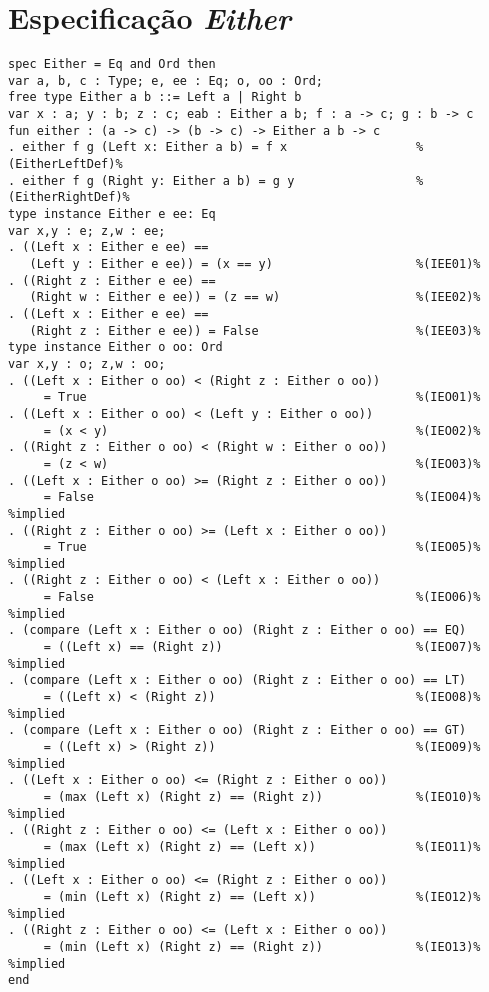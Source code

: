 \section{Especificação \textit{Either}}
\label{appendix:strictSpec:either}
\begin{Verbatim}
spec Either = Eq and Ord then
var a, b, c : Type; e, ee : Eq; o, oo : Ord;
free type Either a b ::= Left a | Right b     
var x : a; y : b; z : c; eab : Either a b; f : a -> c; g : b -> c
fun either : (a -> c) -> (b -> c) -> Either a b -> c
. either f g (Left x: Either a b) = f x                  %(EitherLeftDef)%
. either f g (Right y: Either a b) = g y                 %(EitherRightDef)%
type instance Either e ee: Eq
var x,y : e; z,w : ee;
. ((Left x : Either e ee) == 
   (Left y : Either e ee)) = (x == y)                    %(IEE01)%
. ((Right z : Either e ee) ==
   (Right w : Either e ee)) = (z == w)                   %(IEE02)%
. ((Left x : Either e ee) ==
   (Right z : Either e ee)) = False                      %(IEE03)%
type instance Either o oo: Ord
var x,y : o; z,w : oo;
. ((Left x : Either o oo) < (Right z : Either o oo))
     = True                                              %(IEO01)%
. ((Left x : Either o oo) < (Left y : Either o oo))
     = (x < y)                                           %(IEO02)%
. ((Right z : Either o oo) < (Right w : Either o oo))
     = (z < w)                                           %(IEO03)%
. ((Left x : Either o oo) >= (Right z : Either o oo))
     = False                                             %(IEO04)% %implied
. ((Right z : Either o oo) >= (Left x : Either o oo))
     = True                                              %(IEO05)% %implied
. ((Right z : Either o oo) < (Left x : Either o oo))
     = False                                             %(IEO06)% %implied
. (compare (Left x : Either o oo) (Right z : Either o oo) == EQ)
     = ((Left x) == (Right z))                           %(IEO07)% %implied
. (compare (Left x : Either o oo) (Right z : Either o oo) == LT)
     = ((Left x) < (Right z))                            %(IEO08)% %implied
. (compare (Left x : Either o oo) (Right z : Either o oo) == GT)
     = ((Left x) > (Right z))                            %(IEO09)% %implied
. ((Left x : Either o oo) <= (Right z : Either o oo))
     = (max (Left x) (Right z) == (Right z))             %(IEO10)% %implied
. ((Right z : Either o oo) <= (Left x : Either o oo))
     = (max (Left x) (Right z) == (Left x))              %(IEO11)% %implied
. ((Left x : Either o oo) <= (Right z : Either o oo))
     = (min (Left x) (Right z) == (Left x))              %(IEO12)% %implied
. ((Right z : Either o oo) <= (Left x : Either o oo))
     = (min (Left x) (Right z) == (Right z))             %(IEO13)% %implied
end
\end{Verbatim}


